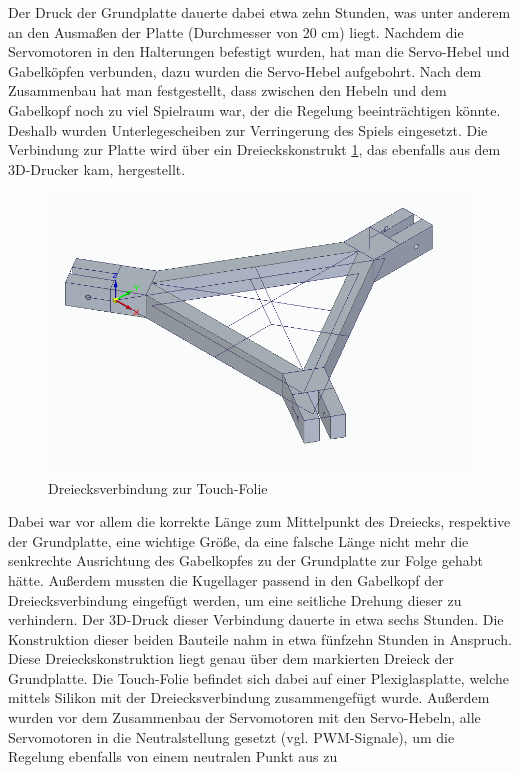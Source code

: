 \documentclass[12pt,a4paper,bibliography=totoc,listof=totoc]{scrartcl}
\begin{document}
Der Druck der Grundplatte dauerte dabei etwa zehn Stunden, was unter anderem an den Ausmaßen der Platte 
(Durchmesser von 20 cm) liegt. Nachdem die Servomotoren in den Halterungen befestigt wurden, hat man die 
Servo-Hebel und Gabelköpfen verbunden, dazu wurden die Servo-Hebel aufgebohrt. Nach dem Zusammenbau hat man 
festgestellt, dass zwischen den Hebeln und dem Gabelkopf noch zu viel Spielraum war, der die Regelung 
beeinträchtigen könnte. Deshalb wurden Unterlegescheiben zur Verringerung des Spiels eingesetzt. Die 
Verbindung zur Platte wird über ein Dreieckskonstrukt \ref{Dreiecksverbindung}, das ebenfalls aus dem 
3D-Drucker kam, hergestellt. 
\begin{figure}[htbp]
	\centering
	\includegraphics[scale = 0.45]{pics/BildDreieck}
	\caption{Dreiecksverbindung zur Touch-Folie}
	\label{Dreiecksverbindung}
\end{figure}
Dabei war vor allem die korrekte Länge zum Mittelpunkt des Dreiecks, 
respektive der Grundplatte, eine wichtige Größe, da eine falsche Länge nicht mehr die senkrechte 
Ausrichtung des Gabelkopfes zu der Grundplatte zur Folge gehabt hätte. Außerdem mussten die Kugellager 
passend in den Gabelkopf der Dreiecksverbindung eingefügt werden, um eine seitliche Drehung dieser zu 
verhindern.
Der 3D-Druck dieser Verbindung dauerte in etwa sechs Stunden. Die Konstruktion dieser beiden Bauteile 
nahm in etwa fünfzehn Stunden in Anspruch. Diese Dreieckskonstruktion liegt genau über dem markierten 
Dreieck der Grundplatte. Die Touch-Folie befindet sich dabei auf einer Plexiglasplatte, welche mittels 
Silikon mit der Dreiecksverbindung zusammengefügt wurde.
Außerdem wurden vor dem Zusammenbau der Servomotoren mit den Servo-Hebeln, alle Servomotoren in die 
Neutralstellung gesetzt (vgl. PWM-Signale), um die Regelung ebenfalls von einem neutralen Punkt aus zu 
\end{document}

